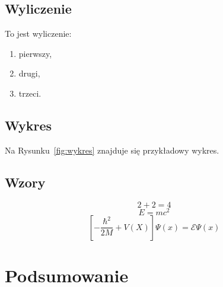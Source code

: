 \documentclass{article}
\begin{document}
\subsection{Wyliczenie}
To jest wyliczenie:
\begin{enumerate}
\item pierwszy,
\item drugi,
\item trzeci.
\end{enumerate}
\subsection{Wykres}
Na Rysunku~\ref{fig:wykres} znajduje się przykładowy wykres.
\subsection{Wzory}
\begin{equation}
2 + 2 = 4
\end{equation}
\begin{equation}
E = mc^2
\end{equation}
\begin{equation}
\left[- \frac{\hbar^2}{2M} + V(X) \right] \Psi(x)=  \mathcal{E} \Psi(x)
\end{equation}

\section{Podsumowanie}
\end{document}
